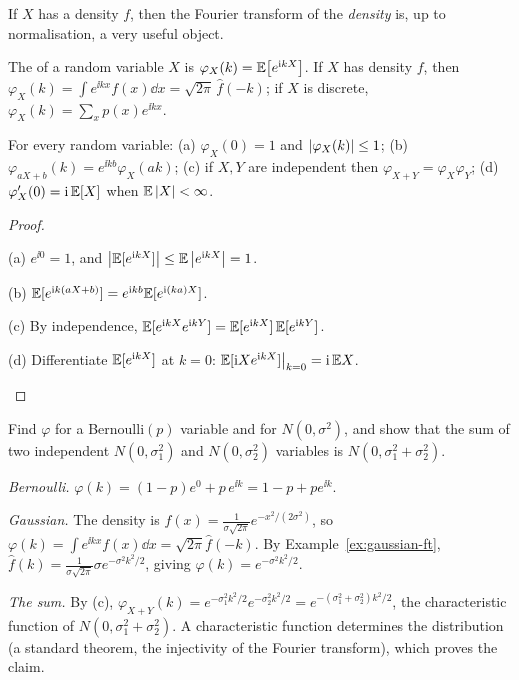 If $X$ has a density $f$, then the Fourier transform of the \emph{density} is, up to normalisation, a very useful object.

\begin{definition}\label{def:charfn}
  The  of a random variable $X$ is $\varphi_X(k)=\mathbb{E}\bigl[e^{\mathrm{i} kX}\bigr]$. If $X$ has density $f$, then $\varphi_X(k)=\int e^{\ii kx}f(x)\dd x=\sqrt{2\pi}\,\hat f(-k)$; if $X$ is discrete, $\varphi_X(k)=\sum_xp(x)e^{\ii kx}$.
\end{definition}

\begin{proposition}\label{prop:charfn}
  For every random variable: (a) $\varphi_X(0)=1$ and $\left|\varphi_X(k)\right|\le1$; (b) $\varphi_{aX+b}(k)=e^{\ii kb}\varphi_X(ak)$; (c) if $X,Y$ are independent then $\varphi_{X+Y}=\varphi_X\varphi_Y$; (d) $\varphi_X'(0)=\mathrm{i}\,\mathbb{E}[X]$ when $\mathbb{E}\left|X\right|<\infty$.
\end{proposition}
\begin{proof}
  \begin{steps}
    \item (a) $e^{\ii0}=1$, and $\left|\mathbb{E}[e^{\mathrm{i} kX}]\right|\le\mathbb{E}\left|e^{\mathrm{i} kX}\right|=1$.
    \item (b) $\mathbb{E}[e^{\mathrm{i} k(aX+b)}]=e^{\mathrm{i} kb}\mathbb{E}[e^{\mathrm{i}(ka)X}]$.
    \item (c) By independence, $\mathbb{E}[e^{\mathrm{i} kX}e^{\mathrm{i} kY}]=\mathbb{E}[e^{\mathrm{i} kX}]\,\mathbb{E}[e^{\mathrm{i} kY}]$.
    \item (d) Differentiate $\mathbb{E}[e^{\mathrm{i} kX}]$ at $k=0$: $\mathbb{E}[\mathrm{i} Xe^{\mathrm{i} kX}]\big|_{k=0}=\mathrm{i}\,\mathbb{E} X$. \qedhere
  \end{steps}
\end{proof}

\begin{example}\label{ex:charfn}
  Find $\varphi$ for a Bernoulli$(p)$ variable and for $N(0,\sigma^2)$, and show that the sum of two independent $N(0,\sigma_1^2)$ and $N(0,\sigma_2^2)$ variables is $N(0,\sigma_1^2+\sigma_2^2)$.
\end{example}
\begin{solution}
  \begin{steps}
    \item \emph{Bernoulli.} $\varphi(k)=(1-p)e^{0}+p\,e^{\ii k}=1-p+pe^{\ii k}$.
    \item \emph{Gaussian.} The density is $f(x)=\frac1{\sigma\sqrt{2\pi}}e^{-x^2/(2\sigma^2)}$, so $\varphi(k)=\int e^{\ii kx}f(x)\dd x=\sqrt{2\pi}\hat f(-k)$. By Example~\ref{ex:gaussian-ft}, $\hat f(k)=\frac1{\sigma\sqrt{2\pi}}\sigma e^{-\sigma^2k^2/2}$, giving $\varphi(k)=e^{-\sigma^2k^2/2}$.
    \item \emph{The sum.} By (c), $\varphi_{X+Y}(k)=e^{-\sigma_1^2k^2/2}e^{-\sigma_2^2k^2/2}=e^{-(\sigma_1^2+\sigma_2^2)k^2/2}$, the characteristic function of $N(0,\sigma_1^2+\sigma_2^2)$. A characteristic function determines the distribution (a standard theorem, the injectivity of the Fourier transform), which proves the claim.
  \end{steps}
\end{solution}

